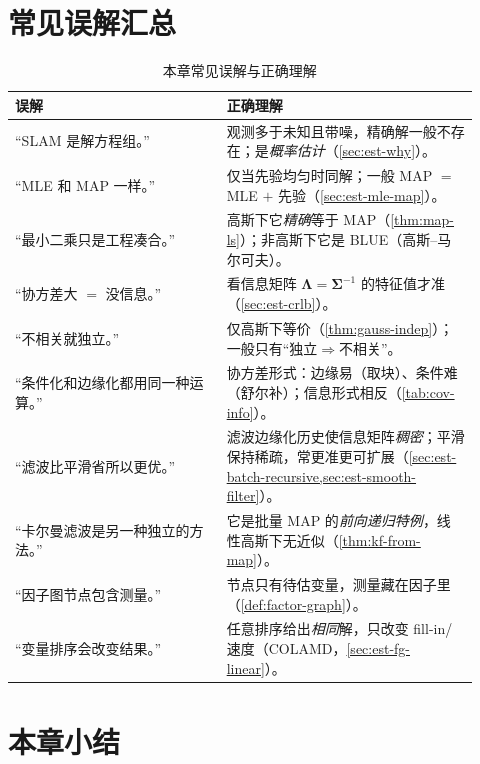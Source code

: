 \section*{常见误解汇总}
\begin{table}[ht]\centering\small
\caption{本章常见误解与正确理解}
\begin{tabular}{p{0.42\linewidth}p{0.5\linewidth}}
\toprule
误解 & 正确理解 \\
\midrule
“SLAM 是解方程组。” & 观测多于未知且带噪，精确解一般不存在；是\emph{概率估计}（\cref{sec:est-why}）。 \\
“MLE 和 MAP 一样。” & 仅当先验均匀时同解；一般 MAP $=$ MLE $+$ 先验（\cref{sec:est-mle-map}）。 \\
“最小二乘只是工程凑合。” & 高斯下它\emph{精确}等于 MAP（\cref{thm:map-ls}）；非高斯下它是 BLUE（高斯–马尔可夫）。 \\
“协方差大 $=$ 没信息。” & 看信息矩阵 $\boldsymbol{\Lambda}=\boldsymbol{\Sigma}^{-1}$ 的特征值才准（\cref{sec:est-crlb}）。 \\
“不相关就独立。” & 仅高斯下等价（\cref{thm:gauss-indep}）；一般只有“独立$\Rightarrow$不相关”。 \\
“条件化和边缘化都用同一种运算。” & 协方差形式：边缘易（取块）、条件难（舒尔补）；信息形式相反（\cref{tab:cov-info}）。 \\
“滤波比平滑省所以更优。” & 滤波边缘化历史使信息矩阵\emph{稠密}；平滑保持稀疏，常更准更可扩展（\cref{sec:est-batch-recursive,sec:est-smooth-filter}）。 \\
“卡尔曼滤波是另一种独立的方法。” & 它是批量 MAP 的\emph{前向递归特例}，线性高斯下无近似（\cref{thm:kf-from-map}）。 \\
“因子图节点包含测量。” & 节点只有待估变量，测量藏在因子里（\cref{def:factor-graph}）。 \\
“变量排序会改变结果。” & 任意排序给出\emph{相同}解，只改变 fill-in/速度（COLAMD，\cref{sec:est-fg-linear}）。 \\
\bottomrule
\end{tabular}
\end{table}

\section*{本章小结}

